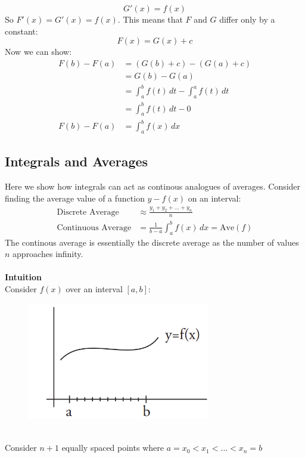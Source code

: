 \documentclass{report}
\begin{document}
\begin{equation*}
G'(x)=f(x)
\end{equation*}
So $F'(x)=G'(x)=f(x)$. This means that $F$ and $G$ differ only by a constant:
\begin{equation*}
F(x)=G(x)+c
\end{equation*} 
Now we can show:
\begin{align*}
F(b)-F(a)&=(G(b)+c)-(G(a)+c)\\
&=G(b)-G(a)\\
&=\int_a^bf(t)\,dt-\int_a^af(t)\,dt\\
&=\int_a^bf(t)\,dt-0\\
F(b)-F(a)&=\int_a^bf(x)\,dx
\end{align*}
\newpage

\subsection{Integrals and Averages} %
Here we show how integrals can act as continous analogues of averages. Consider
finding the average value of a function $y-f(x)$ on an interval:
\begin{align*}
\text{Discrete Average}&\approx\frac{y_1+y_2+\ldots+y_n}{n}\\
\text{Continuous Average}&=\frac{1}{b-a}\int_a^bf(x)\,dx=\text{Ave}(f)
\end{align*} 
The continous average is essentially the discrete average as the number of values $n$ 
approaches infinity.\\
\vspace{1mm}\\
\textbf{Intuition}\\
Consider $f(x)$ over an interval $[a,b]$:
\begin{figure}[h]
\includegraphics[width=8cm]{Capture32}\\
\centering
{}
\end{figure}\\
Consider $n+1$ equally spaced points where $a=x_0<x_1<\ldots<x_n=b$
\end{document}
